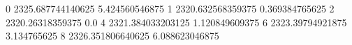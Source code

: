 0 2325.687744140625 5.424560546875
1 2320.632568359375 0.369384765625
2 2320.26318359375 0.0
4 2321.384033203125 1.120849609375
6 2323.39794921875 3.134765625
8 2326.351806640625 6.088623046875
